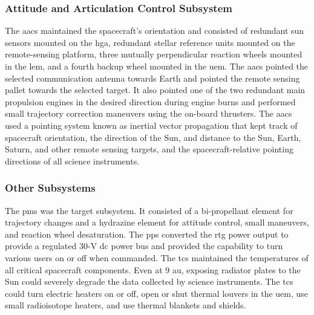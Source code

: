 \documentclass[crop=false,class=article,oneside]{standalone}
\begin{document}
        \subsubsection{%
            \footnotesize{%
                Attitude and Articulation
                Control Subsystem
            }
        }
            \label{subsubsec:usr_att_and_art_cont_subsye}
            The \gls{aacs} maintained the spacecraft's
            orientation and consisted of redundant sun
            sensors mounted on the \gls{hga}, redundant
            stellar reference units mounted on the
            remote-sensing platform, three mutually
            perpendicular reaction wheels mounted in the
            \gls{lem}, and a fourth backup wheel mounted in
            the \gls{uem}. The \gls{aacs} pointed the selected
            communication antenna towards Earth and pointed
            the remote sensing pallet towards the selected
            target. It also pointed one of the two redundant
            main propulsion engines in the desired direction
            during engine burns and performed small trajectory
            correction maneuvers using the on-board thrusters.
            The \gls{aacs} used a pointing system known as
            \gls{inertial vector propagation} that kept track
            of spacecraft orientation, the direction of the
            Sun, and distance to the Sun, Earth, Saturn,
            and other remote sensing targets, and the
            spacecraft-relative pointing directions of all
            science instruments.
        \subsubsection{\footnotesize{Other Subsystems}}
            \label{subsubsec:usr_other_subsys}
            The \gls{pms} was the target subsystem. It
            consisted of a bi-propellant element for
            trajectory changes and a \gls{hydrazine} element
            for attitude control, small maneuvers, and
            reaction wheel desaturation. The \gls{pps}
            converted the \gls{rtg} power output to provide
            a regulated 30-V \gls{dc} power bus and provided
            the capability to turn various users on or off
            when commanded. The \gls{tcs} maintained the
            temperatures of all critical spacecraft
            components. Even at $9$ \gls{au}, exposing
            radiator plates to the Sun could severely degrade
            the data collected by science instruments. The
            \gls{tcs} could turn electric heaters on or off,
            open or shut thermal louvers in the \gls{uem},
            use small radioisotope heaters, and use thermal
            blankets and shields.
\end{document}
